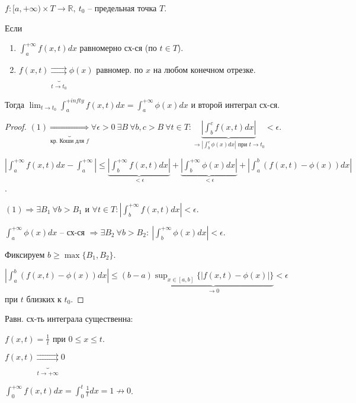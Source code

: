 \begin{theorem}
    $f: [a, +\infty) \times T \rightarrow \mathbb{R}, \ t_0$ -- предельная точка $T$.

    Если
    \begin{enumerate}
        \item {
            $\int_{a}^{+\infty} { f(x, t) dx }$ равномерно сх-ся (по $t \in T$).
        }
        \item {
            $f(x, t) \underbrace{\rightrightarrows}_{t \rightarrow t_0} \phi(x)$ равномер. по $x$ на любом конечном отрезке.
        }
    \end{enumerate}

    Тогда $\lim_{t \rightarrow t_0} { \int_{a}^{+infty} { f(x, t) dx } } = \int_{a}^{+\infty} { \phi(x) dx }$ и второй интеграл сх-ся. 
\end{theorem}

\begin{proof}
    $(1) \underbrace{\Rightarrow}_{\text{кр. Коши для }f} \forall \epsilon > 0 \ \exists B \ \forall b, c > B \ \forall t \in T: \underbrace{| \int_{b}^{c} { f(x, t) dx } |}_{\rightarrow |\int_{b}^{c} { \phi(x) dx }| \text { при } t \rightarrow t_0}  < \epsilon$.

    $| \int_{a}^{+\infty} { f(x, t) dx } - \int_{a}^{+\infty} | \leq \underbrace{| \int_{b}^{+\infty} { f(x, t) dx } |}_{< \epsilon} + \underbrace{| \int_{b}^{+\infty} { \phi(x) dx } |}_{< \epsilon} + |\int_{a}^{b} { \left( f(x, t) - \phi(x) \right) dx }|$.

    $(1) \Rightarrow \exists B_1 \ \forall b > B_1$ и $\forall t \in T: | \int_{b}^{+\infty} { f(x, t) dx } | < \epsilon$.

    $\int_{a}^{+\infty} { \phi(x) dx }$ -- сх-ся $\Rightarrow \exists B_2 \ \forall b > B_2: \ | \int_{b}^{+\infty} { \phi(x) dx } | < \epsilon$.

    Фиксируем $b \geq \max \{ B_1, B_2 \}$.

    $| \int_{a}^{b} {\left( f(x, t) - \phi(x) \right) dx} | \leq (b - a) \underbrace{\sup_{x \in [a, b]} \{ | f(x, t) - \phi(x) | \}}_{\rightarrow 0} < \epsilon$ при $t$ близких к $t_0$. 
\end{proof}

\begin{remark}
    Равн. сх-ть интеграла существенна:

    $f(x, t) = \frac{1}{t}$ при $0 \leq x \leq t$.

    $f(x, t) \underbrace{\rightrightarrows}_{t \rightarrow + \infty} 0$

    $\int_{0}^{+\infty} { f(x, t) dx} = \int_{0}^{t} { \frac{1}{t} dx } = 1 \not \rightarrow 0 $.
\end{remark}


